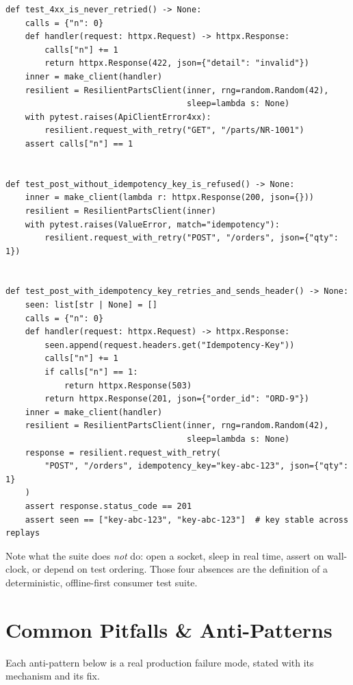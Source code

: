 \begin{verbatim}
def test_4xx_is_never_retried() -> None:
    calls = {"n": 0}
    def handler(request: httpx.Request) -> httpx.Response:
        calls["n"] += 1
        return httpx.Response(422, json={"detail": "invalid"})
    inner = make_client(handler)
    resilient = ResilientPartsClient(inner, rng=random.Random(42),
                                     sleep=lambda s: None)
    with pytest.raises(ApiClientError4xx):
        resilient.request_with_retry("GET", "/parts/NR-1001")
    assert calls["n"] == 1


def test_post_without_idempotency_key_is_refused() -> None:
    inner = make_client(lambda r: httpx.Response(200, json={}))
    resilient = ResilientPartsClient(inner)
    with pytest.raises(ValueError, match="idempotency"):
        resilient.request_with_retry("POST", "/orders", json={"qty": 1})


def test_post_with_idempotency_key_retries_and_sends_header() -> None:
    seen: list[str | None] = []
    calls = {"n": 0}
    def handler(request: httpx.Request) -> httpx.Response:
        seen.append(request.headers.get("Idempotency-Key"))
        calls["n"] += 1
        if calls["n"] == 1:
            return httpx.Response(503)
        return httpx.Response(201, json={"order_id": "ORD-9"})
    inner = make_client(handler)
    resilient = ResilientPartsClient(inner, rng=random.Random(42),
                                     sleep=lambda s: None)
    response = resilient.request_with_retry(
        "POST", "/orders", idempotency_key="key-abc-123", json={"qty": 1}
    )
    assert response.status_code == 201
    assert seen == ["key-abc-123", "key-abc-123"]  # key stable across replays
\end{verbatim}

Note what the suite does \emph{not} do: open a socket, sleep in real time,
assert on wall-clock, or depend on test ordering. Those four absences are the
definition of a deterministic, offline-first consumer test suite.


\section{Common Pitfalls \& Anti-Patterns}
\label{sec:ch02-pitfalls}

Each anti-pattern below is a real production failure mode, stated with its
mechanism and its fix.

